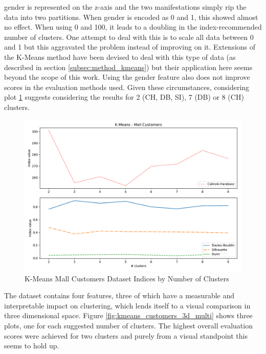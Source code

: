 gender is represented on the z-axis and the two manifestations simply rip the data into two partitions. When gender is encoded as 0 and 1, this showed almost no effect. When using 0 and 100, it leads to a doubling in the index-recommended number of clusters. One attempt to deal with this is to scale all data between 0 and 1 but this aggravated the problem instead of improving on it. Extensions of the K-Means method have been devised to deal with this type of data (as described in section \ref{subsec:method_kmeans}) but their application here seems beyond the scope of this work. Using the gender feature also does not improve scores in the evaluation methods used. Given these circumstances, considering plot \ref{fig:kmeans_customers_indices_plot} suggests considering the results for 2 (\gls{CH}, \gls{DB}, \gls{SI}), 7 (\gls{DB}) or 8 (\gls{CH}) clusters.

\begin{figure}[h]
\caption{K-Means Mall Customers Dataset Indices by Number of Clusters}
\begin{center}
\includegraphics[width=1.0\textwidth]{images/kmeans_customers_index_plot.pdf}
\end{center}
\label{fig:kmeans_customers_indices_plot}
\end{figure}

\vspace{-0.5cm}
The dataset contains four features, three of which have a measurable and interpretable impact on clustering, which lends itself to a visual comparison in three dimensional space. Figure \ref{fig:kmeans_customers_3d_multi} shows three plots, one for each suggested number of clusters. The highest overall evaluation scores were achieved for two clusters and purely from a visual standpoint this seems to hold up.

